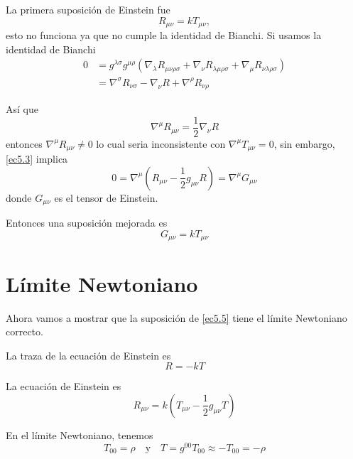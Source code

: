 \documentclass[../main]{subfiles}
\begin{document}
La primera suposición de Einstein fue 
\begin{equation}
    R_{\mu\nu}=kT_{\mu\nu},
\end{equation}
esto no funciona ya que no cumple la identidad de Bianchi. Si usamos la identidad de Bianchi 
\begin{equation}
    \begin{split}
        0&=g^{\lambda\sigma}g^{\mu\rho}(\nabla_{\lambda}R_{\mu\nu\rho\sigma}+\nabla_{\nu}R_{\lambda\mu\rho\sigma}+\nabla_{\mu}R_{\nu\lambda\rho\sigma})\\
        &=\nabla^{\sigma} R_{\nu\sigma}-\nabla_{\nu} R +\nabla^{\rho}R_{\nu\rho}
    \end{split}
\end{equation}

Así que 
\begin{equation}
    \nabla^{\mu} R_{\mu\nu}=\dfrac{1}{2}\nabla_{\nu}R
    \label{ec5.3}
\end{equation}
entonces $\nabla^{\mu} R_{\mu\nu} \neq 0$ lo cual seria inconsistente con $\nabla^{\mu} T_{\mu\nu}=0$, sin embargo, \eqref{ec5.3} implica 
\begin{equation}
    0=\nabla^{\mu}\left(R_{\mu\nu}-\dfrac{1}{2}g_{\mu\nu}R\right)=\nabla^{\mu} G_{\mu\nu}
\end{equation}
donde $G_{\mu\nu}$ es el tensor de Einstein.

Entonces una suposición mejorada es 
\begin{equation}
    G_{\mu\nu}=kT_{\mu\nu}
    \label{ec5.5}
\end{equation}

\section{Límite Newtoniano}

Ahora vamos a mostrar que la suposición de \eqref{ec5.5} tiene el límite Newtoniano correcto.

La traza de la ecuación de Einstein es 
\begin{equation}
    R=-kT
\end{equation}

La ecuación de Einstein es 
\begin{equation}
    R_{\mu\nu}=k\left(T_{\mu\nu}-\dfrac{1}{2}g_{\mu\nu}T\right)
\end{equation}

En el límite Newtoniano, tenemos 
\begin{equation}
    T_{00}=\rho \quad \text{y} \quad T=g^{00}T_{00}\approx -T_{00}=-\rho
\end{equation}
\end{document}
